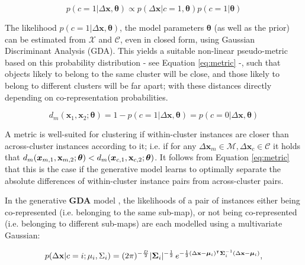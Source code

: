 \begin{equation}
\label{eq:linkprob}
p(c=1|\Delta \boldsymbol{x}, \boldsymbol{\theta}) \propto p(\Delta \boldsymbol{x} | c=1, \boldsymbol{\theta}) p(c=1|\boldsymbol{\theta})
\end{equation}

The likelihood $ p(c=1|\Delta \boldsymbol{x}, \boldsymbol{\theta}) $, the model parameters $ \boldsymbol{\theta} $ (as well as the prior) can be estimated from $\mathcal{X}$ and $\mathcal{C}$, even in closed form, using Gaussian Discriminant Analysis (GDA). This yields a suitable non-linear pseudo-metric based on this probability distribution - see Equation \ref{eq:metric} -, such that objects likely to belong to the same cluster will be close, and those likely to belong to different clusters will be far apart; with these distances directly depending on co-representation probabilities. 

\begin{equation}
\label{eq:metric}
d_m(\boldsymbol x_1, \boldsymbol x_2; \boldsymbol{\theta}) = 1 - p(c=1|\Delta \boldsymbol x, \boldsymbol{\theta}) = p(c=0|\Delta \boldsymbol x, \boldsymbol{\theta})
\end{equation}

A metric is well-suited for clustering if within-cluster instances are closer than across-cluster instances according to it; i.e. if for any $\Delta \boldsymbol x_m \in \mathcal{M}, \Delta \boldsymbol x_c \in \mathcal{C} $ it holds that $ d_m(\boldsymbol x_{m,1}, \textbf x_{m,2}; \boldsymbol{\theta}) < d_m(\boldsymbol x_{c,1}, \textbf x_{c,2}; \boldsymbol{\theta}) $. It follows from Equation \ref{eq:metric} that this is the case if the generative model learns to optimally separate the absolute differences of within-cluster instance pairs from across-cluster pairs.

In the generative \textbf{GDA} model \citep{bensmail1996regularized}, the likelihoods of a pair of instances either being co-represented (i.e. belonging to the same sub-map), or not being co-represented (i.e. belonging to different sub-maps) are each modelled using a multivariate Gaussian: 

\begin{equation}
\label{eq:mvnormal}
p( \Delta \textbf x | c=i; \mu_i, \Sigma_i) = (2\pi)^{-\frac{D}{2}}|\boldsymbol\Sigma_i|^{-\frac{1}{2}}\, e^{ -\frac{1}{2}(\Delta \mathbf{x}-\boldsymbol\mu_i)^\intercal\boldsymbol\Sigma_i^{-1}(\Delta \mathbf{x}-\boldsymbol\mu_i) },
\end{equation}

